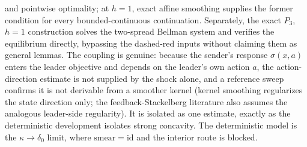 \begin{center}
{and pointwise optimality; at $h=1$, exact affine smoothing supplies the former
condition for every bounded-continuous continuation. Separately, the exact
$P_3$, $h=1$ construction solves the two-spread Bellman system and verifies the
equilibrium directly, bypassing the dashed-red inputs without claiming them as
general lemmas. The coupling is
genuine: because the sender's response $\sigma(x,a)$ enters the leader objective
and depends on the leader's own action $a$, the action-direction estimate is not
supplied by the shock alone, and a reference sweep confirms it is not derivable
from a smoother kernel (kernel smoothing regularizes the state direction only;
the feedback-Stackelberg literature also assumes the analogous leader-side
regularity). It is isolated as one estimate, exactly as the deterministic
development isolates strong concavity. The deterministic model is the
$\kappa\to\delta_0$ limit, where $\mathrm{smear}=\mathrm{id}$ and the interior
route is blocked.}
\label{fig:shock-construction}
\end{center}
\clearpage
